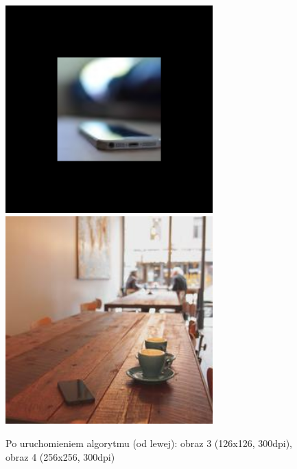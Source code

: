 \documentclass[a4paper,12pt]{book}
\begin{document}
\begin{figure}
	\caption{Po uruchomieniem algorytmu (od lewej): obraz 3 (126x126, 300dpi), obraz 4 (256x256, 300dpi)}
	\includegraphics[width=8cm, height=8cm]{phone-geo-modified.png}
	\includegraphics[width=8cm, height=8cm]{coffee-unmodified.jpg}
\end{figure}
\newpage
\end{document}
